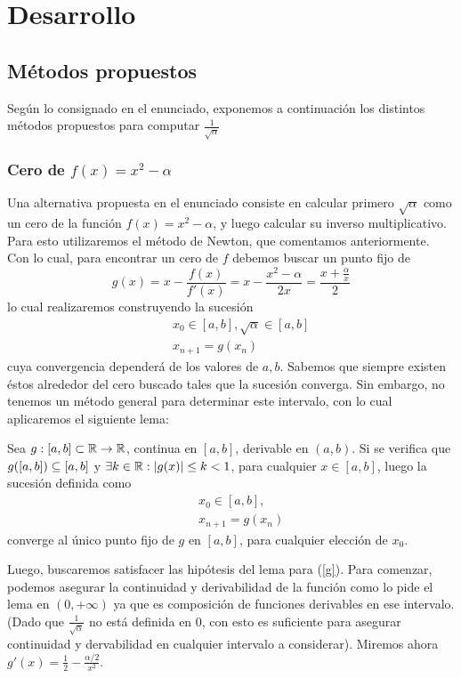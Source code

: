 \section{Desarrollo}
	\subsection{Métodos propuestos}
	Según lo consignado en el enunciado, exponemos a continuación los distintos métodos propuestos para computar $\frac{1}{\sqrt{\alpha}}$
		\subsubsection{Cero de $f(x) = x^2 -\alpha$}
		Una alternativa propuesta en el enunciado consiste en calcular primero $\sqrt{\alpha}$ como un cero de la función $f(x) = x^2 -\alpha$, y luego calcular su inverso multiplicativo. Para esto utilizaremos el método de Newton, que comentamos anteriormente. Con lo cual, para encontrar un cero de $f$ debemos buscar un punto fijo de 
		\begin{equation}
			g(x) = x - \frac{f(x)}{f'(x)} = x - \frac{x^2 - \alpha}{2x} = \frac{x + \frac{\alpha}{x}}{2}
		\label{g}	
		\end{equation}
lo cual realizaremos construyendo la sucesión
	\begin{eqnarray}
		&& x_0 \in [a,b], \sqrt{\alpha} \in [a,b] \nonumber \\
		&& x_{n+1} = g(x_n) \nonumber
	\end{eqnarray}
cuya convergencia dependerá de los valores de $a,b$. Sabemos que siempre existen éstos alrededor del cero buscado tales que la sucesión converga. Sin embargo, no tenemos un método general para determinar este intervalo, con lo cual aplicaremos el siguiente lema:
\begin{lema}
Sea $g: [a,b] \subset \mathbb{R} \rightarrow \mathbb{R}$, continua en $[a,b]$, derivable en $(a,b)$. Si se verifica que $g([a,b]) \subseteq [a,b]$ y $\exists k \in\mathbb{R} : |g(x)| \leq k < 1$, para cualquier $x\in [a,b]$, luego la sucesión definida como 
	\begin{eqnarray}
		&& x_0 \in [a,b], \nonumber \\
		&& x_{n+1} = g(x_n) \nonumber
	\end{eqnarray}
	converge al único punto fijo de $g$ en $[a,b]$, para cualquier elección de $x_0$.
\end{lema}
Luego, buscaremos satisfacer las hipótesis del lema para (\ref{g}). Para comenzar, podemos asegurar la continuidad y derivabilidad de la función como lo pide el lema en $(0, +\infty)$ ya que es composición de funciones derivables en ese intervalo. (Dado que $\frac{1}{\sqrt{\alpha}}$ no está definida en 0, con esto es suficiente para asegurar continuidad y dervabilidad en cualquier intervalo a considerar). Miremos ahora $ g'(x) = \frac{1}{2} - \frac{\alpha/2}{x^2}$.\\
